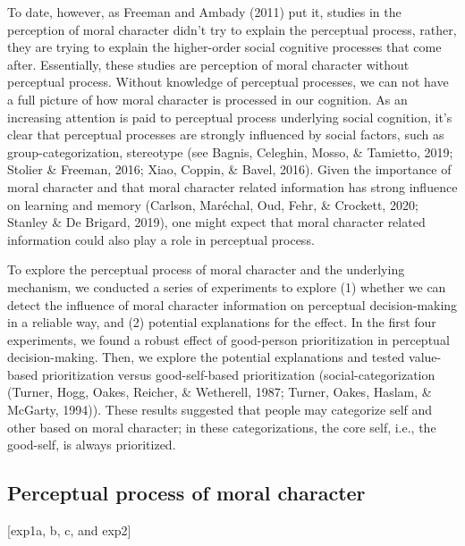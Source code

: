 \documentclass[
  english,
  man]{apa6}
\begin{document}
To date, however, as Freeman and Ambady (2011) put it, studies in the perception of moral character didn't try to explain the perceptual process, rather, they are trying to explain the higher-order social cognitive processes that come after. Essentially, these studies are perception of moral character without perceptual process. Without knowledge of perceptual processes, we can not have a full picture of how moral character is processed in our cognition. As an increasing attention is paid to perceptual process underlying social cognition, it's clear that perceptual processes are strongly influenced by social factors, such as group-categorization, stereotype (see Bagnis, Celeghin, Mosso, \& Tamietto, 2019; Stolier \& Freeman, 2016; Xiao, Coppin, \& Bavel, 2016). Given the importance of moral character and that moral character related information has strong influence on learning and memory (Carlson, Maréchal, Oud, Fehr, \& Crockett, 2020; Stanley \& De Brigard, 2019), one might expect that moral character related information could also play a role in perceptual process.

To explore the perceptual process of moral character and the underlying mechanism, we conducted a series of experiments to explore (1) whether we can detect the influence of moral character information on perceptual decision-making in a reliable way, and (2) potential explanations for the effect. In the first four experiments, we found a robust effect of good-person prioritization in perceptual decision-making. Then, we explore the potential explanations and tested value-based prioritization versus good-self-based prioritization (social-categorization (Turner, Hogg, Oakes, Reicher, \& Wetherell, 1987; Turner, Oakes, Haslam, \& McGarty, 1994)). These results suggested that people may categorize self and other based on moral character; in these categorizations, the core self, i.e., the good-self, is always prioritized.

\hypertarget{perceptual-process-of-moral-character}{%
\subsection{Perceptual process of moral character}\label{perceptual-process-of-moral-character}}

{[}exp1a, b, c, and exp2{]}
\end{document}
